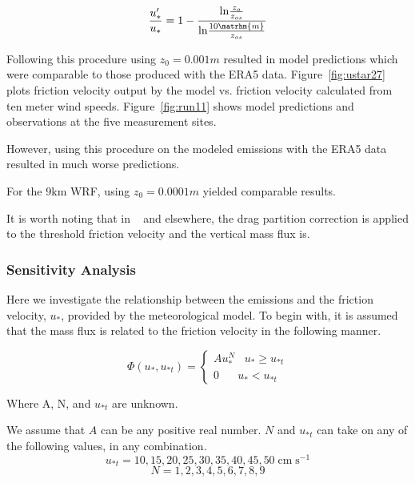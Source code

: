 \documentclass[draft]{agujournal2018}
\begin{document}
$$\frac{u_*'}{u_*} = 1 - \frac{\mathrm{ln}\frac{z_o}{z_{os}}}{\mathrm{ln}\frac{10\matrhm{m}}{z_{os}}} $$


Following this procedure using  $z_0=0.001m$  resulted in model predictions which were comparable to those produced with the ERA5 data. Figure~\ref{fig:ustar27} plots friction velocity output by the model vs. friction velocity calculated from ten meter wind speeds. Figure~\ref{fig:run11} shows model predictions and observations at the five measurement sites.

However, using this procedure on the modeled emissions with the ERA5 data resulted in much worse predictions.

For the 9km WRF, using $z_0=0.0001m$ yielded  comparable results.

It is worth noting that in ~\cite{Darmenova09} and elsewhere, the drag partition correction is applied to the threshold friction velocity and the vertical mass flux is.





\subsubsection{Sensitivity Analysis}

Here we investigate the relationship between the emissions and the friction velocity, $u_*$, provided by the meteorological model.
To begin with, it is assumed that the mass flux is related to the friction velocity in the following manner.

\begin{equation}
\Phi(u_*, u_{*t}) =\begin{cases}
Au_*^N \;\;\; u_{*} \geq u_{*t} \\
0 \;\;\;\;\;\;  u_* < u_{*t} 
\end{cases}
\label{eq:massflux}
\end{equation}

Where A, N, and $u_{*t}$ are unknown. 

We assume that $A$ can be any
positive real number. $N$ and $u_{*t}$ can take on any of the following values, in any combination.
$$ u_{*t} = 10,15,20,25,30,35,40,45,50 \; \mathrm{cm} \; \mathrm{s}^{-1}$$
$$ N = 1,2,3,4,5,6,7,8,9 $$
\end{document}
